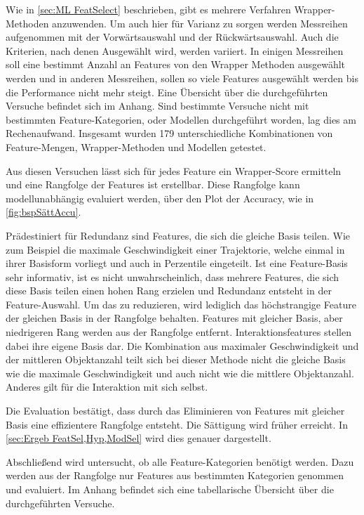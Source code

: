 Wie in \ref{sec:ML FeatSelect} beschrieben, gibt es mehrere Verfahren Wrapper-Methoden anzuwenden. Um auch hier für Varianz zu sorgen werden Messreihen aufgenommen mit der Vorwärtsauswahl und der Rückwärtsauswahl. Auch die Kriterien, nach denen Ausgewählt wird, werden variiert. In einigen Messreihen soll eine bestimmt Anzahl an Features von den Wrapper Methoden ausgewählt werden und in anderen Messreihen, sollen so viele Features ausgewählt werden bis die Performance nicht mehr steigt. Eine Übersicht über die durchgeführten Versuche befindet sich im Anhang. Sind bestimmte Versuche nicht mit bestimmten Feature-Kategorien, oder Modellen durchgeführt worden, lag dies am Rechenaufwand. Insgesamt wurden 179 unterschiedliche Kombinationen von Feature-Mengen, Wrapper-Methoden und Modellen getestet. \par

Aus diesen Versuchen lässt sich für jedes Feature ein Wrapper-Score ermitteln und eine Rangfolge der Features ist erstellbar. Diese Rangfolge kann modellunabhängig evaluiert werden, über den Plot der Accuracy, wie in \ref{fig:bspSättAccu}. \par

Prädestiniert für Redundanz sind Features, die sich die gleiche Basis teilen. Wie zum Beispiel die maximale Geschwindigkeit einer Trajektorie, welche einmal in ihrer Basisform vorliegt und auch in Perzentile eingeteilt. Ist eine Feature-Basis sehr informativ, ist es nicht unwahrscheinlich, dass mehrere Features, die sich diese Basis teilen einen hohen Rang erzielen und Redundanz entsteht in der Feature-Auswahl. Um das zu reduzieren, wird lediglich das höchstrangige Feature der gleichen Basis in der Rangfolge behalten. Features mit gleicher Basis, aber niedrigeren Rang werden aus der Rangfolge entfernt. Interaktionsfeatures stellen dabei ihre eigene Basis dar. Die Kombination aus maximaler Geschwindigkeit und der mittleren Objektanzahl teilt sich bei dieser Methode nicht die gleiche Basis wie die maximale Geschwindigkeit und auch nicht wie die mittlere Objektanzahl. Anderes gilt für die Interaktion mit sich selbst. \par

Die Evaluation bestätigt, dass durch das Eliminieren von Features mit gleicher Basis eine effizientere Rangfolge entsteht. Die Sättigung wird früher erreicht. In \ref{sec:Ergeb FeatSel,Hyp,ModSel} wird dies genauer dargestellt. \par

Abschließend wird untersucht, ob alle Feature-Kategorien benötigt werden. Dazu werden aus der Rangfolge nur Features aus bestimmten Kategorien genommen und evaluiert. Im Anhang befindet sich eine tabellarische Übersicht über die durchgeführten Versuche. \par

